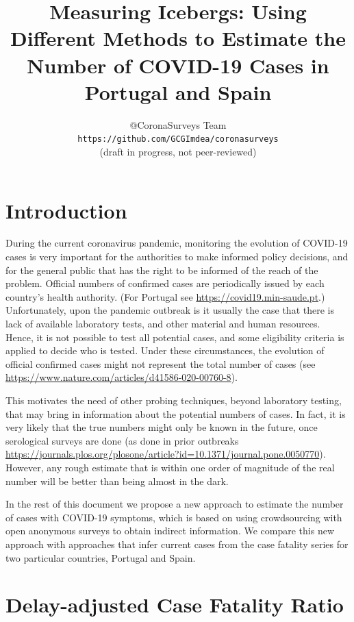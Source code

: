 \documentclass{article}
\begin{document}
\title{Measuring Icebergs: Using Different Methods to Estimate the Number of COVID-19 Cases in Portugal and Spain}
\author{$@$CoronaSurveys Team \\ \texttt{https://github.com/GCGImdea/coronasurveys}\\(draft in progress, not peer-reviewed)}
\maketitle
\section{Introduction}

During the current coronavirus pandemic, monitoring the evolution of COVID-19 cases is very important for the authorities to make
informed policy decisions, and for the general public that has the right to be informed of the reach of the problem. 
Official numbers of confirmed cases are periodically issued by each country's health authority. (For Portugal see \url{https://covid19.min-saude.pt}.)
Unfortunately, upon the pandemic outbreak is it usually the case that there is lack of available laboratory tests, and other material and human resources. Hence, it is not possible to test all potential cases, and some eligibility criteria is applied to decide who is tested.
Under these circumstances, the evolution of official confirmed cases might not represent the total number of cases (see \url{https://www.nature.com/articles/d41586-020-00760-8}).  

This motivates the need of other probing techniques, beyond laboratory testing, that may bring in information about the potential numbers of cases. In fact, it is very likely that the true numbers might only be known in the future, once serological surveys are done (as done in prior outbreaks \url{https://journals.plos.org/plosone/article?id=10.1371/journal.pone.0050770}). However, any rough estimate that is within one order of magnitude of the real number will be better than being almost in the dark.

In the rest of this document we propose a new approach to estimate the number of cases with COVID-19 symptoms, which is based on using crowdsourcing with open anonymous surveys to obtain indirect information. We compare this new approach with approaches that infer current cases from the case fatality series for two particular countries, Portugal and Spain.

\section{Delay-adjusted Case Fatality Ratio}
\end{document}
